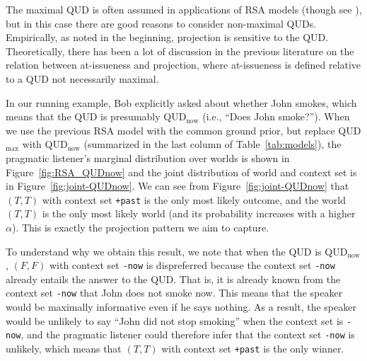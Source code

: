 The maximal QUD is often assumed in applications of RSA models (though see ), but 
 in this case there are good reasons to consider non-maximal QUDs.
Empirically, as noted in the beginning, projection is sensitive to the QUD.
Theoretically, there has been a lot of discussion in the previous literature
 \cite{Beaver2010:Have-You-Noticed, SimonsEtAl2001:What-Projects-and-Why} on the relation between at-issueness and projection, where at-issueness is defined 
 relative to a QUD not necessarily maximal.
 
In our running example, Bob explicitly asked about whether John smokes, 
 which means that the QUD is presumably QUD$_\textrm{now}$ (i.e., ``Does John smoke?'').
When we use the previous RSA model with the common ground prior, but  
 replace QUD$_\textrm{max}$ with QUD$_\textrm{now}$ (summarized in the 
 last column of Table~\ref{tab:models}), the pragmatic listener's marginal distribution over worlds is shown in Figure~\ref{fig:RSA_QUDnow} and the joint
 distribution of world and context set is in Figure~\ref{fig:joint-QUDnow}.
We can see from Figure~\ref{fig:joint-QUDnow} that $(T, T)$ with context set
 \verb=+past= is 
 the only most likely outcome, and the world $(T, T)$ is the 
 only most likely world (and its probability increases with a higher $\alpha$).
This is exactly the projection pattern we aim to capture.

To understand why we obtain this result, we note that 
 when the QUD is QUD$_\textrm{now}$, $(F, F)$ with context set
 \verb=-now= is dispreferred because the context set \verb=-now= already entails 
 the answer to the QUD. 
That is, it is already known from the context set \verb=-now= that John does not 
 smoke now.
This means that the speaker would be maximally informative even if he says nothing.
As a result, the speaker would be unlikely to say ``John did not stop smoking'' 
 when the context set is \verb=-now=, and the pragmatic listener could therefore
 infer that the context set \verb=-now= is unlikely, which means that 
 $(T, T)$ with context set \verb=+past= is the only winner.


